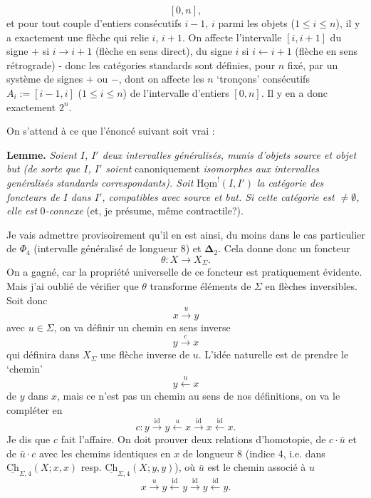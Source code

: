 \documentclass[11pt]{article}
\newcommand{\printedpage}[1]{\marginpar{\footnotesize p.~#1}}
\newcommand{\msp}[1]{\marginpar{\footnotesize [#1]}}
\newcommand{\uCh}{\underline{\mathrm{Ch}}}
\newcommand{\uHom}{\underline{\mathrm{Hom}}}
\newcommand{\bDelta}{\boldsymbol{\Delta}}
\begin{document}
\[
[0,n],
\]
et pour tout couple d'entiers consécutifs $i-1$, $i$ parmi les objets ($1 \leq i \leq n$), il y a exactement une flèche qui relie $i$, $i+1$. On affecte l'intervalle $[i,i+1]$ du signe $+$ si $i \longrightarrow i+1$ (flèche en sens direct), du signe $i$ si $i \longleftarrow i+1$ (flèche en sens rétrograde) - donc les catégories standards sont définies, pour $n$ fixé, par un système de signes $+$ ou $-$, dont on affecte les $n$ `tronçons' consécutifs $A_i := [i-1,i]$ ($1 \leq i \leq n$) de l'intervalle d'entiers $[0,n]$. Il y en a donc exactement $2^n$.

On s'attend à ce que l'énoncé suivant soit vrai :

\textbf{Lemme.} \textit{Soient $I$, $I'$ deux intervalles généralisés, munis d'objets source et objet but (de sorte que $I$, $I'$ soient} canoniquement \textit{isomorphes aux intervalles genéralisés standards correspondants). Soit} $\uHom^!(I,I')$ %
\msp{page 26}\textit{la catégorie des foncteurs de $I$ dans $I'$, compatibles avec source et but. Si cette catégorie est $\neq \emptyset$, elle est} 0\textit{-connexe} (et, je présume, même contractile?).

Je vais admettre provisoirement qu'il en est ainsi, du moins dans le cas particulier de $\Phi_4$ (intervalle généralisé de longueur 8) et $\bDelta_2$. Cela donne donc un foncteur
\[
\theta : X \longrightarrow X_\Sigma.
\]
On a gagné, car la propriété universelle de ce foncteur est pratiquement évidente. Mais j'ai oublié de vérifier que $\theta$ transforme éléments de $\Sigma$ en flèches inversibles. Soit donc
\[
x \xrightarrow{u} y
\]
avec $u \in \Sigma$, on va définir un chemin en sens inverse
\[
y \xrightarrow{c} x
\]
qui définira dans $X_\Sigma$ une flèche inverse de $u$. L'idée naturelle est de prendre le `chemin'
\[
y \xleftarrow{u} x
\]
\printedpage{17}
de $y$ dans $x$, mais ce n'est pas un chemin au sens de nos définitions, on va le compléter en
\[
c : y \xrightarrow{\mathrm{id}} y \xleftarrow{u} x \xrightarrow{\mathrm{id}} x \xleftarrow{\mathrm{id}} x.
\]
Je dis que $c$ fait l'affaire. On doit prouver deux relations d'homotopie, de $c \cdot \bar{u}$ et de $\bar{u} \cdot c$ avec les chemins identiques en $x$ de longueur 8 (indice 4, i.e. dans $\uCh_{\Sigma,4}(X;x,x)$ resp. $\uCh_{\Sigma,4}(X;y,y)$),
\msp{page 27}où $\bar{u}$ est le chemin associé à $u$
\[
x \xrightarrow{u} y \xleftarrow{\mathrm{id}} y \xrightarrow{\mathrm{id}} y \xleftarrow{\mathrm{id}} y.
\]
\end{document}
